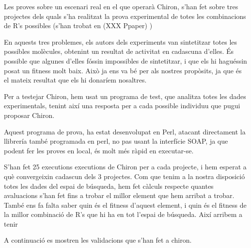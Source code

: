 \documentclass[titlepage,a4paper,12pt]{book}
\begin{document}
	Les proves sobre un escenari real en el que operarà Chiron, s'han fet sobre
	tres projectes dels quals s'ha realitzat la prova experimental de totes les
	combinacions de R's possibles (s'han trobat en (XXX Ppaper) )

	En aquests tres problemes, els autors dels experiments van sintetitzar totes
	les possibles molècules, obtenint un resultat de activitat en cadascuna
	d'elles.  És possible que algunes d'elles fóssin impossibles de sintetitzar,
	i que els hi haguéssin posat un fitness molt baix.  Això ja ens va bé per
	als nostres propòsits, ja que és el mateix resultat que els hi donaríem
	nosaltres.

	Per a testejar Chiron, hem usat un programa de test, que analitza totes les
	dades experimentals, tenint així una resposta per a cada possible individuu
	que pugui proposar Chiron.

	Aquest programa de prova, ha estat desenvolupat en Perl, atacant directament
	la llibrería també programada en perl, no pas usant la interfície SOAP, ja
	que podent fer les proves en local, és molt més ràpid en executar-se.

	S'han fet 25 executions executions de Chiron per a cada projecte, i hem
	esperat a què convergeixin cadascun dels 3 projectes.  Com que tenim a la
	nostra disposició totes les dades del espai de búsqueda, hem fet càlculs
	respecte quantes avaluacions s'han fet fins a trobar el millor element que
	hem arribat a trobar.  També ens fa falta saber quin és el fitness d'aquest
	element, i quin és el fitness de la millor combinació de R's que hi ha en
	tot l'espai de búsqueda. Així arribem a tenir




	A continuació es mostren les validacions que s'han fet a chiron.  

\end{document}
